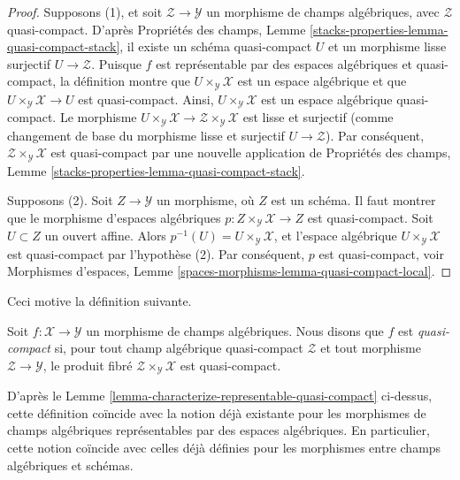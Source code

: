 \begin{proof}
Supposons (1), et soit $\mathcal{Z} \to \mathcal{Y}$ un morphisme de champs
algébriques, avec $\mathcal{Z}$ quasi-compact. D'après Propriétés des champs,
Lemme \ref{stacks-properties-lemma-quasi-compact-stack}, il existe un schéma
quasi-compact $U$ et un morphisme lisse surjectif
$U \to \mathcal{Z}$. Puisque $f$ est représentable par des espaces
algébriques et quasi-compact, la définition montre que
$U \times_\mathcal{Y} \mathcal{X}$ est un espace algébrique et que
$U \times_\mathcal{Y} \mathcal{X} \to U$ est quasi-compact.
Ainsi, $U \times_\mathcal{Y} \mathcal{X}$ est un espace algébrique
quasi-compact. Le morphisme
$U \times_\mathcal{Y} \mathcal{X} \to
\mathcal{Z} \times_\mathcal{Y} \mathcal{X}$
est lisse et surjectif (comme changement de base du morphisme lisse et
surjectif $U \to \mathcal{Z}$). Par conséquent,
$\mathcal{Z} \times_\mathcal{Y} \mathcal{X}$ est quasi-compact par une
nouvelle application de Propriétés des champs, Lemme
\ref{stacks-properties-lemma-quasi-compact-stack}.

\medskip\noindent
Supposons (2). Soit $Z \to \mathcal{Y}$ un morphisme, où $Z$ est un schéma.
Il faut montrer que le morphisme d'espaces algébriques
$p : Z \times_\mathcal{Y} \mathcal{X} \to Z$ est quasi-compact.
Soit $U \subset Z$ un ouvert affine. Alors
$p^{-1}(U) = U \times_\mathcal{Y} \mathcal{X}$,
et l'espace algébrique $U \times_\mathcal{Y} \mathcal{X}$ est quasi-compact
par l'hypothèse (2). Par conséquent, $p$ est quasi-compact, voir Morphismes
d'espaces, Lemme \ref{spaces-morphisms-lemma-quasi-compact-local}.
\end{proof}

\noindent
Ceci motive la définition suivante.

\begin{definition}
\label{definition-quasi-compact}
Soit $f : \mathcal{X} \to \mathcal{Y}$ un morphisme de champs algébriques.
Nous disons que $f$ est {\it quasi-compact} si, pour tout champ algébrique
quasi-compact $\mathcal{Z}$ et tout morphisme
$\mathcal{Z} \to \mathcal{Y}$, le produit fibré
$\mathcal{Z} \times_\mathcal{Y} \mathcal{X}$ est quasi-compact.
\end{definition}

\noindent
D'après le Lemme \ref{lemma-characterize-representable-quasi-compact}
ci-dessus, cette définition coïncide avec la notion déjà existante pour les
morphismes de champs algébriques représentables par des espaces algébriques.
En particulier, cette notion coïncide avec celles déjà définies pour les
morphismes entre champs algébriques et schémas.

